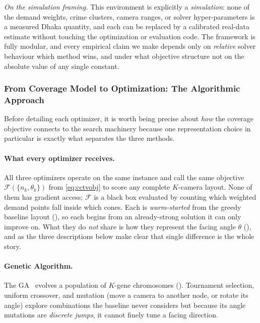 \documentclass{ai-lab-report}
\begin{document}
\emph{On the simulation framing.} This environment is explicitly a \emph{simulation}: none of the demand weights, crime clusters, camera ranges, or solver hyper-parameters is a measured Dhaka quantity, and each can be replaced by a calibrated real-data estimate without touching the optimization or evaluation code. The framework is fully modular, and every empirical claim we make depends only on \emph{relative} solver behaviour which method wins, and under what objective structure not on the absolute value of any single constant.

\subsubsection{From Coverage Model to Optimization: The Algorithmic Approach}

Before detailing each optimizer, it is worth being precise about \emph{how} the coverage objective connects to the search machinery because one representation choice in particular is exactly what separates the three methods.

\paragraph{What every optimizer receives.}
All three optimizers operate on the same instance and call the same objective $\mathcal F(\{n_k,\theta_k\})$ from \cref{eq:cctvobj} to score any complete $K$-camera layout. None of them has gradient access; $\mathcal F$ is a black box evaluated by counting which weighted demand points fall inside which cones. Each is \emph{warm-started} from the greedy baseline layout (), so each begins from an already-strong solution it can only improve on. What they do \emph{not} share is how they represent the facing angle $\theta$ (), and as the three descriptions below make clear that single difference is the whole story.

\paragraph{Genetic Algorithm.}
The GA~\citep{holland1975adaptation} evolves a population of $K$-gene chromosomes (). Tournament selection, uniform crossover, and mutation (move a camera to another node, or rotate its angle) explore combinations the baseline never considers but because its angle mutations are \emph{discrete jumps}, it cannot finely tune a facing direction.
\end{document}
